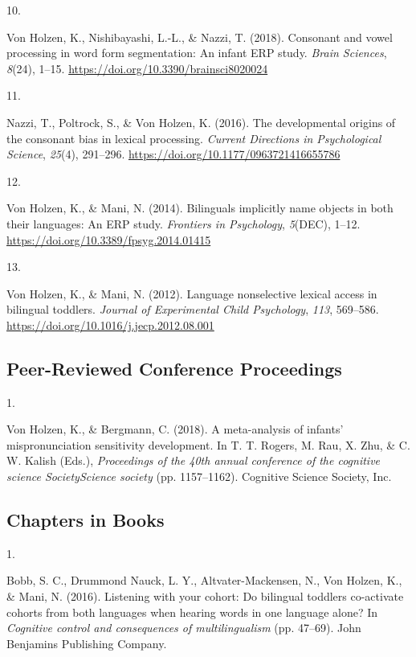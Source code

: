 \documentclass[10pt,a4paper,]{article}
\newlength{\cslhangindent}
\newlength{\csllabelwidth}
\newcommand{\CSLLeftMargin}[1]{\parbox[t]{\csllabelwidth}{\hfill #1~}}
\newcommand{\CSLRightInline}[1]{\parbox[t]{\linewidth - \cslhangindent - \csllabelwidth}{#1}\vspace{0.8ex}}
\begin{document}
\leavevmode{}%
\CSLLeftMargin{10. }%
\CSLRightInline{Von Holzen, K., Nishibayashi, L.-L., \& Nazzi, T.
(2018). Consonant and vowel processing in word form segmentation: An
infant ERP study. \emph{Brain Sciences}, \emph{8}(24), 1--15.
\url{https://doi.org/10.3390/brainsci8020024}}

\leavevmode{}%
\CSLLeftMargin{11. }%
\CSLRightInline{Nazzi, T., Poltrock, S., \& Von Holzen, K. (2016). The
developmental origins of the consonant bias in lexical processing.
\emph{Current Directions in Psychological Science}, \emph{25}(4),
291--296. \url{https://doi.org/10.1177/0963721416655786}}

\leavevmode{}%
\CSLLeftMargin{12. }%
\CSLRightInline{Von Holzen, K., \& Mani, N. (2014). Bilinguals
implicitly name objects in both their languages: An ERP study.
\emph{Frontiers in Psychology}, \emph{5}(DEC), 1--12.
\url{https://doi.org/10.3389/fpsyg.2014.01415}}

\leavevmode{}%
\CSLLeftMargin{13. }%
\CSLRightInline{Von Holzen, K., \& Mani, N. (2012). Language
nonselective lexical access in bilingual toddlers. \emph{Journal of
Experimental Child Psychology}, \emph{113}, 569--586.
\url{https://doi.org/10.1016/j.jecp.2012.08.001}}

\hypertarget{peer-reviewed-conference-proceedings}{%
\subsection{Peer-Reviewed Conference
Proceedings}\label{peer-reviewed-conference-proceedings}}

\hypertarget{bibliography}{}
\leavevmode{}%
\CSLLeftMargin{1. }%
\CSLRightInline{Von Holzen, K., \& Bergmann, C. (2018). A meta-analysis
of infants' mispronunciation sensitivity development. In T. T. Rogers,
M. Rau, X. Zhu, \& C. W. Kalish (Eds.), \emph{Proceedings of the 40th
annual conference of the cognitive science SocietyScience society} (pp.
1157--1162). Cognitive Science Society, Inc.}

\hypertarget{chapters-in-books}{%
\subsection{Chapters in Books}\label{chapters-in-books}}

\hypertarget{bibliography}{}
\leavevmode{}%
\CSLLeftMargin{1. }%
\CSLRightInline{Bobb, S. C., Drummond Nauck, L. Y., Altvater-Mackensen,
N., Von Holzen, K., \& Mani, N. (2016). Listening with your cohort: Do
bilingual toddlers co-activate cohorts from both languages when hearing
words in one language alone? In \emph{Cognitive control and consequences
of multilingualism} (pp. 47--69). John Benjamins Publishing Company.}
\end{document}
